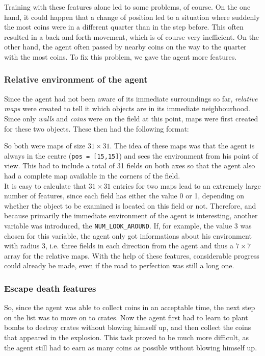 Training with these features alone led to some problems, of course. On the one hand, it could happen that a change of position led to a situation where suddenly the most coins were in a different quarter than in the step before. This often resulted in a back and forth movement, which is of course very inefficient. On the other hand, the agent often passed by nearby coins on the way to the quarter with the most coins. To fix this problem, we gave the agent more features.

\subsubsection*{Relative environment of the agent}
Since the agent had not been aware of its immediate surroundings so far, \textit{relative maps} were created to tell it which objects are in its immediate neighbourhood. Since only \textit{walls} and \textit{coins} were on the field at this point, maps were first created for these two objects. These then had the following format:
\vspace{0.1cm}

\vspace{0.1cm}
So both were maps of size $31\times 31$. The idea of these maps was that the agent is always in the centre (\texttt{pos = [15,15]}) and sees the environment from his point of view. This had to include a total of 31 fields on both axes so that the agent also had a complete map available in the corners of the field.
\\

It is easy to calculate that $31\times 31$ entries for two maps lead to an extremely large number of features, since each field has either the value 0 or 1, depending on whether the object to be examined is located on this field or not. Therefore, and because primarily the immediate environment of the agent is interesting, another variable was introduced, the \texttt{NUM\_LOOK\_AROUND}. If, for example, the value 3 was chosen for this variable, the agent only got informations about his environment with radius 3, i.e. three fields in each direction from the agent and thus a $7\times 7$ array for the relative maps. With the help of these features, considerable progress could already be made, even if the road to perfection was still a long one.

\subsubsection{Escape death features}
So, since the agent was able to collect coins in an acceptable time, the next step on the list was to move on to crates. Now the agent first had to learn to plant bombs to destroy crates without blowing himself up, and then collect the coins that appeared in the explosion. This task proved to be much more difficult, as the agent still had to earn as many coins as possible without blowing himself up. 

